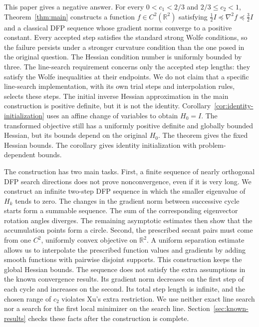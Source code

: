 \documentclass[11pt]{article}
\newcommand{\R}{\mathbb R}
\begin{document}
This paper gives a negative answer.  For every $0<c_1<2/3$ and
$2/3\le c_2<1$, Theorem~\ref{thm:main} constructs a function
$f\in C^2(\R^2)$ satisfying $\frac12I\preceq\nabla^2f\preceq\frac32I$ and a
classical DFP sequence whose gradient norms converge to a positive constant.
Every accepted step satisfies the standard strong Wolfe conditions, so the
failure persists under a stronger curvature condition than the one posed in
the original question.  The Hessian condition number is uniformly bounded by
three.  The line-search requirement concerns only the accepted step lengths:
they satisfy the Wolfe inequalities at their endpoints.  We do not claim that
a specific line-search implementation, with its own trial steps and
interpolation rules, selects these steps.  The initial inverse Hessian
approximation in the main construction is positive definite, but it is not the
identity.  Corollary~\ref{cor:identity-initialization} uses an affine change of
variables to obtain $H_0=I$.  The transformed objective still has a uniformly
positive definite and globally bounded Hessian, but its bounds depend on the
original $H_0$.  The theorem gives the fixed Hessian bounds.  The corollary
gives identity initialization with problem-dependent bounds.

The construction has two main tasks.  First, a finite sequence of nearly
orthogonal DFP search directions does not prove nonconvergence, even if it is
very long.  We construct an infinite two-step DFP sequence in which the
smaller eigenvalue of $H_k$ tends to zero.
The changes in the gradient norm between successive cycle starts form a
summable sequence.  The sum of the corresponding eigenvector rotation angles
diverges.  The remaining asymptotic estimates then show that the accumulation
points form a circle.  Second, the prescribed secant pairs must come from one
$C^2$, uniformly convex objective on $\R^2$.  A uniform separation estimate
allows us to interpolate the prescribed function values and gradients by
adding smooth functions with pairwise disjoint supports.  This construction
keeps the global Hessian bounds.  The sequence does not satisfy the extra
assumptions in the known convergence results.  Its gradient norm decreases on
the first step of each cycle and increases on the second.  Its total step
length is infinite, and the chosen range of $c_2$ violates Xu's extra
restriction.  We use neither exact line search nor a search for the first
local minimizer on the search line.  Section~\ref{sec:known-results} checks
these facts after the construction is complete.
\end{document}

